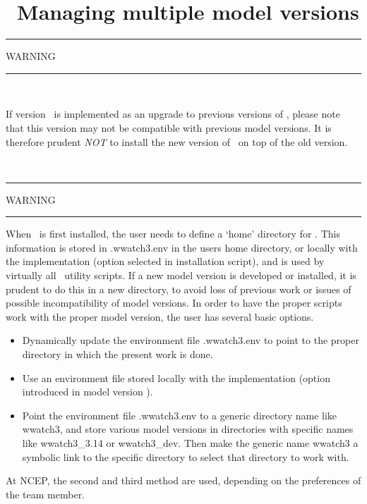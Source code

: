 \pagestyle{myheadings} \setcounter{page}{1} \setcounter{footnote}{0}

\section{~Managing multiple model versions} \label{app:more}
\newcounters 
\vssub

\begin{center}
\rule[1mm]{55mm}{1.0mm} WARNING \rule[1mm]{55mm}{1.0mm} \\ \vspace{\baselineskip}
\parbox{120mm}{If version \WWver\ is implemented as an upgrade to previous
versions of \ws, please note that this version may not be compatible with
previous model versions. It is therefore prudent {\it NOT} to install the new
version of \ws\ on top of the old version.} \\
\vspace{\baselineskip} \rule[1mm]{55mm}{1.0mm} WARNING
\rule[1mm]{55mm}{1.0mm}
\end{center}

\noindent
When \ws\ is first installed, the user needs to define a `home' directory for
\ws. This information is stored in {\file .wwatch3.env} in the users home
directory, or locally with the implementation (option selected in installation
script), and is used by virtually all \ws\ utility scripts. If a new model
version is developed or installed, it is prudent to do this in a new
directory, to avoid loss of previous work or issues of possible
incompatibility of model versions. In order to have the proper scripts work
with the proper model version, the user has several basic options.

\begin{itemize}

\item Dynamically update the environment file {\file .wwatch3.env} to point to
      the proper directory in which the present work is done.

\item Use an environment file stored locally with the implementation (option
      introduced in model version \WWver).

\item Point the environment file {\file .wwatch3.env} to a generic directory
      name like {\file wwatch3}, and store various model versions in
      directories with specific names like {\file wwatch3\_3.14} or {\file
      wwatch3\_dev}. Then make the generic name {\file wwatch3} a symbolic
      link to the specific directory to select that directory to work with.

\end{itemize}

\noindent
At NCEP, the second and third method are used, depending on the preferences of
the team member.

\bpage \pagestyle{empty}
